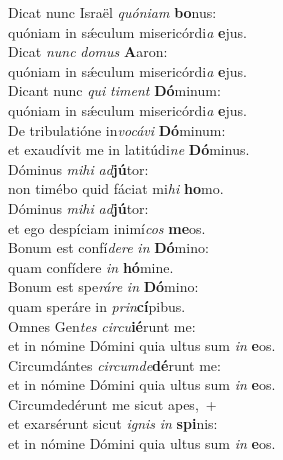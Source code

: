 \evenverse Dicat nunc Israël \textit{quó}\textit{ni}\textit{am} \textbf{bo}nus:~\*\\
\evenverse quóniam in sǽculum misericórdi\textit{a} \textbf{e}jus.\\
\oddverse Dicat \textit{nunc} \textit{do}\textit{mus} \textbf{A}aron:~\*\\
\oddverse quóniam in sǽculum misericórdi\textit{a} \textbf{e}jus.\\
\evenverse Dicant nunc \textit{qui} \textit{ti}\textit{ment} \textbf{Dó}minum:~\*\\
\evenverse quóniam in sǽculum misericórdi\textit{a} \textbf{e}jus.\\
\oddverse De tribulatióne in\textit{vo}\textit{cá}\textit{vi} \textbf{Dó}minum:~\*\\
\oddverse et exaudívit me in latitúdi\textit{ne} \textbf{Dó}minus.\\
\evenverse Dóminus \textit{mi}\textit{hi} \textit{ad}\textbf{jú}tor:~\*\\
\evenverse non timébo quid fáciat mi\textit{hi} \textbf{ho}mo.\\
\oddverse Dóminus \textit{mi}\textit{hi} \textit{ad}\textbf{jú}tor:~\*\\
\oddverse et ego despíciam inimí\textit{cos} \textbf{me}os.\\
\evenverse Bonum est confí\textit{de}\textit{re} \textit{in} \textbf{Dó}mino:~\*\\
\evenverse quam confídere \textit{in} \textbf{hó}mine.\\
\oddverse Bonum est spe\textit{rá}\textit{re} \textit{in} \textbf{Dó}mino:~\*\\
\oddverse quam speráre in \textit{prin}\textbf{cí}pibus.\\
\evenverse Omnes Gen\textit{tes} \textit{cir}\textit{cu}\textbf{ié}runt me:~\*\\
\evenverse et in nómine Dómini quia ultus sum \textit{in} \textbf{e}os.\\
\oddverse Circumdántes \textit{cir}\textit{cum}\textit{de}\textbf{dé}runt me:~\*\\
\oddverse et in nómine Dómini quia ultus sum \textit{in} \textbf{e}os.\\
\evenverse Circumdedérunt me sicut apes,~+\\
\evenverse  et exarsérunt sicut \textit{i}\textit{gnis} \textit{in} \textbf{spi}nis:~\*\\
\evenverse et in nómine Dómini quia ultus sum \textit{in} \textbf{e}os.\\
